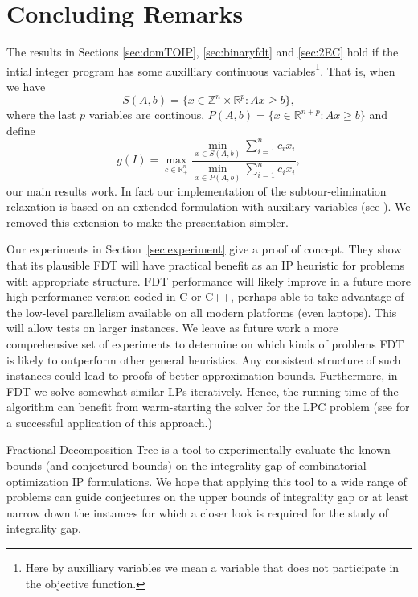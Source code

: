 \section{Concluding Remarks}

The results in Sections \ref{sec:domTOIP}, \ref{sec:binaryfdt}  and \ref{sec:2EC} hold if the intial integer program has some auxilliary continuous variables\footnote{Here by auxilliary variables we mean a variable that does not participate in the objective function.}. That is, when we have 
\begin{equation*}
S(A,b) = \{x\in \mathbb{Z}^n\times \mathbb{R}^p: Ax\geq b\},
\end{equation*}
where the last $p$ variables are continous, $P(A,b) = \{x\in \mathbb{R}^{n+p}: Ax\geq b\}$
and define
\begin{equation*}
g(I) = \max_{c\in \mathbb{R}^n_+}\frac{\min_{x\in S(A,b)} \sum_{i=1}^{n}c_ix_i}{\min_{x\in P(A,b)} \sum_{i=1}^{n}c_ix_i},
\end{equation*}
our main results work. In fact our implementation of the subtour-elimination relaxation is based on an extended formulation with auxiliary variables (see \cite{subtour-extended}). We removed this extension to make the presentation simpler.

Our experiments in Section~\ref{sec:experiment} give a proof of concept. They show that its plausible FDT will have practical benefit as an IP heuristic for problems with appropriate structure. FDT performance will likely improve in a future more high-performance version coded in C or C++, perhaps able to take advantage of the low-level parallelism available on all modern platforms (even laptops).  This will allow tests on larger instances. We leave as future work a more comprehensive set of experiments to determine on which kinds of problems FDT is likely to outperform other general heuristics. Any consistent structure of such instances could lead to proofs of better approximation bounds. Furthermore, in FDT we solve somewhat similar LPs iteratively. Hence, the running time of the algorithm can benefit from warm-starting the solver for the LPC problem (see \cite{warmstart} for a successful application of this approach.)


Fractional Decomposition Tree is a tool to experimentally evaluate the known bounds (and conjectured bounds) on the integrality gap of combinatorial optimization IP formulations. We hope that applying this tool to a wide range of problems can guide conjectures on the upper bounds of integrality gap or at least narrow down the instances for which a closer look is required for the study of integrality gap.


